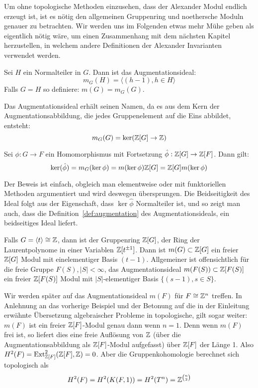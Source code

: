 Um ohne topologische Methoden einzusehen, dass der Alexander Modul endlich erzeugt ist, ist es nötig den allgemeinen Gruppenring und noethersche Moduln genauer zu betrachten. Wir werden uns im Folgenden etwas mehr Mühe geben als eigentlich nötig wäre, um einen Zusammenhang mit dem nächsten Kapitel herzustellen, in welchem andere Definitionen der Alexander Invarianten verwendet werden.

\begin{defn}[Augmentationsideal]
\label{def:augmentation}
	Sei $H$ ein Normalteiler in $G$. Dann ist das Augmentationsideal:
	\[
		m_G(H) = \langle (h-1), h\in H \rangle
	\]
	Falls $G=H$ so definiere: $m(G)=m_G(G)$.
\end{defn}

\begin{bem}
Das Augmentationsideal erhält seinen Namen, da es aus dem Kern der Augmentationsabbildung, die jedes Gruppenelement auf die Eins abbildet, entsteht:
\[
	m_G(G) = \ker(\mathbb{Z}[G] \to \mathbb{Z})
\]

\end{bem}
\begin{lem}
\label{lem:augmker}
	Sei $\phi:G \to F$ ein Homomorphismus mit Fortsetzung $\hat \phi: \mathbb{Z}[G] \to \mathbb{Z}[F]$. Dann gilt:
	\[
		\ker(\hat\phi) = m_G(\ker\phi)= m(\ker\phi) \mathbb{Z}[G] = \mathbb{Z}[G] m(\ker\phi) 
	\]
\end{lem}
Der Beweis ist einfach, obgleich man elementweise oder mit funktoriellen Methoden argumentiert und wird deswegen übersprungen. Die Beidseitigkeit des Ideal folgt aus der Eigenschaft, dass $\ker\hat\phi$ Normalteiler ist, und so zeigt man auch, dass die Definition~\ref{def:augmentation} des Augmentationsideals, ein beidseitiges Ideal liefert.


\begin{bsp}
	Falls $G=\langle t \rangle \cong \mathbb{Z}$, dann ist der Gruppenring $\mathbb{Z} [G]$, der Ring der Laurentpolynome in einer Variablen $\mathbb{Z}[t^{\pm 1}]$. Dann ist $m(G) \subset \mathbb{Z}[G]$ ein freier $\mathbb{Z}[G]$ Modul mit einelementiger Basis $(t-1)$. Allgemeiner ist offensichtlich für die freie Gruppe $F(S), |S| < \infty$, das Augmentationsideal $m(F(S)) \subset \mathbb{Z}[F(S)]$ ein freier $\mathbb{Z}[F(S)]$ Modul mit $|S|$-elementiger Basis $\{(s-1), s \in S\}$.
\end{bsp}

\begin{bsp}
	\label{ex:eilmaclane}
	Wir werden später auf das Augmentationsideal $m(F)$ für $F\cong \mathbb{Z}^n$ treffen. In Anlehnung an das vorherige Beispiel und der Betonung auf die in der Einleitung erwähnte Übersetzung algebraischer Probleme in topologische, gilt sogar weiter: $m(F)$ ist ein freier $\mathbb{Z}[F]$-Modul genau dann wenn $n=1$. Denn wenn $m(F)$ frei ist, so liefert dies eine freie Auflösung von $\mathbb{Z}$ (über die Augmentationsabbildung als $\mathbb{Z}[F]$-Modul aufgefasst) über $\mathbb{Z}[F]$ der Länge 1. Also $H^2(F) = \operatorname{Ext}^2_{\mathbb{Z}[F]}(\mathbb{Z} [F],\mathbb{Z})=0$. Aber die Gruppenkohomologie berechnet sich topologisch als 
	\[
	H^2(F)=H^2(K(F,1))=H^2(T^n)=\mathbb{Z}^{\binom n2}		
	\]
\end{bsp}



